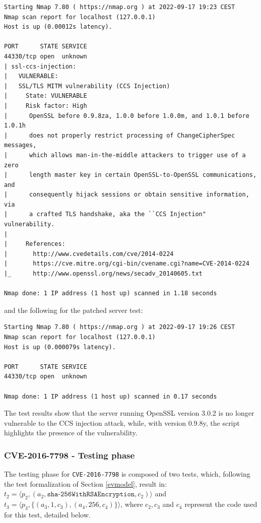 \begin{verbatim}
Starting Nmap 7.80 ( https://nmap.org ) at 2022-09-17 19:23 CEST
Nmap scan report for localhost (127.0.0.1)
Host is up (0.00012s latency).

PORT      STATE SERVICE
44330/tcp open  unknown
| ssl-ccs-injection: 
|   VULNERABLE:
|   SSL/TLS MITM vulnerability (CCS Injection)
|     State: VULNERABLE
|     Risk factor: High
|      OpenSSL before 0.9.8za, 1.0.0 before 1.0.0m, and 1.0.1 before 1.0.1h
|      does not properly restrict processing of ChangeCipherSpec messages,
|      which allows man-in-the-middle attackers to trigger use of a zero
|      length master key in certain OpenSSL-to-OpenSSL communications, and
|      consequently hijack sessions or obtain sensitive information, via
|      a crafted TLS handshake, aka the ``CCS Injection" vulnerability.
|           
|     References:
|       http://www.cvedetails.com/cve/2014-0224
|       https://cve.mitre.org/cgi-bin/cvename.cgi?name=CVE-2014-0224
|_      http://www.openssl.org/news/secadv_20140605.txt

Nmap done: 1 IP address (1 host up) scanned in 1.18 seconds
\end{verbatim}

and the following for the patched server test:
\begin{verbatim}
Starting Nmap 7.80 ( https://nmap.org ) at 2022-09-17 19:26 CEST
Nmap scan report for localhost (127.0.0.1)
Host is up (0.000079s latency).

PORT      STATE SERVICE
44330/tcp open  unknown

Nmap done: 1 IP address (1 host up) scanned in 0.17 seconds
\end{verbatim}

The test results show that the server running OpenSSL version 3.0.2 is no longer vulnerable to the CCS injection attack, while, with version 0.9.8y, the script highlights the presence of the vulnerability.


\subsubsection{CVE-2016-7798 - Testing phase}
The testing phase for \texttt{CVE-2016-7798} is composed of two tests, which, following the test formalization of Section \ref{evmodel}, result in: \(t_2 = \langle p_2, (a_2, \texttt{sha-256WithRSAEncryption}, c_2) \rangle\) and \(t_3 = \langle p_3, \{(a_3, 1, c_3), (a_4, 256, c_4)\}  \rangle\), where \(c_2, c_3\) and \(c_4\) represent the code used for this test, detailed below.

